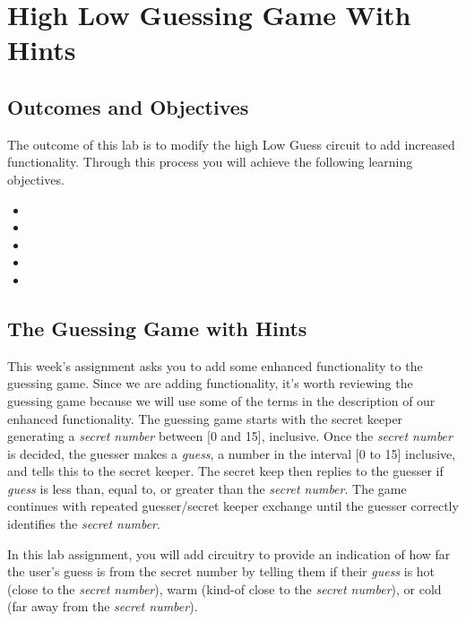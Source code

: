 \chapter{High Low Guessing Game With Hints}
\label{chapter:hlggwh}
\graphicspath{ {./Lab05HighLowWithHints/Fig} }



\section{Outcomes and Objectives}

The outcome of this lab is to modify the high Low Guess 
circuit to add increased functionality.
Through this process you will achieve the following
learning objectives.
\begin{itemize}
	\item {}
	\item {}
	\item {}
	\item {}
	\item{}
\end{itemize}


\section{The Guessing Game with Hints}

This week's assignment asks you to add some enhanced functionality to
the guessing game. Since we are adding functionality, it's worth reviewing the 
guessing game because we will use some of
the terms in the description of our enhanced functionality. The guessing game
starts with the secret keeper generating a \emph{secret number} between
{[}0 and 15{]}, inclusive. Once the \emph{secret number} is decided, the
guesser makes a \emph{guess}, a number in the interval {[}0 to 15{]}
inclusive, and tells this to the secret keeper. The secret keep then
replies to the guesser if \emph{guess} is less than, equal to, or
greater than the \emph{secret number}. The game continues with repeated
guesser/secret keeper exchange until the guesser correctly identifies
the \emph{secret number}.

In this lab assignment, you will add circuitry to provide an
indication of how far the user's guess is from the secret number by
telling them if their \emph{guess} is hot (close to the \emph{secret
number}), warm (kind-of close to the \emph{secret number}), or cold (far
away from the \emph{secret number}).

